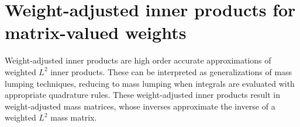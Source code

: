\documentclass{siamart0216}
\newcommand{\LRp}[1]{\left( #1 \right)}
\newcommand{\jump}[1] {\ensuremath{\llbracket#1\rrbracket}}
\begin{document}
%

\section{Weight-adjusted inner products for matrix-valued weights}
\label{sec:mwadg}
Weight-adjusted inner products are high order accurate approximations of weighted $L^2$ inner products.  These can be interpreted as generalizations of mass lumping techniques, reducing to mass lumping when integrals are evaluated with appropriate quadrature rules.  These weight-adjusted inner products result in weight-adjusted mass matrices, whose inverses approximate the inverse of a weighted $L^2$ mass matrix.  
\end{document}
